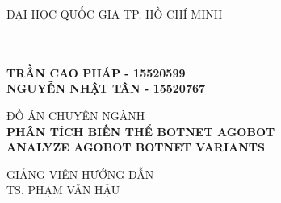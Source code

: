 
\begin{titlepage} %

  \begin{center} %


  {\Large ĐẠI HỌC QUỐC GIA TP\@. HỒ CHÍ MINH}\\
  {}\\ %
  {}\\ %


  \vfill

  \textbf{\large TRẦN CAO PHÁP - 15520599\\ NGUYỄN NHẬT TÂN - 15520767}\\


  \vfill

  {\Large ĐỒ ÁN CHUYÊN NGÀNH}\\[0.2cm] %
  \textbf{\LARGE PHÂN TÍCH BIẾN THỂ BOTNET AGOBOT}\\ %
  \textbf{\LARGE ANALYZE AGOBOT BOTNET VARIANTS}\\ %

  \vfill %

  {\large {GIẢNG VIÊN HƯỚNG DẪN} }\\
  \Large{TS\@. PHẠM VĂN HẬU} %



\end{center}
\end{titlepage}
